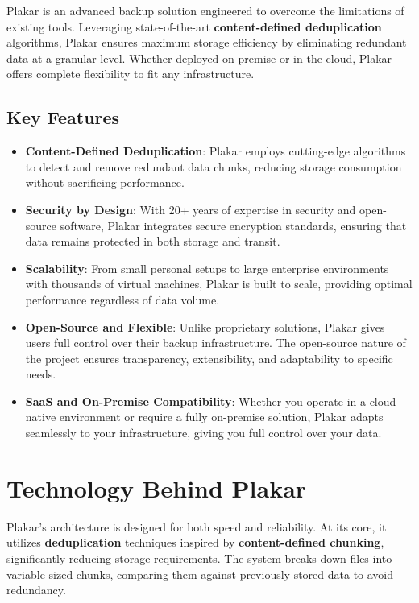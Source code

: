 \documentclass{article}
\begin{document}
Plakar is an advanced backup solution engineered to overcome the limitations of existing tools. Leveraging state-of-the-art \textbf{content-defined deduplication} algorithms, Plakar ensures maximum storage efficiency by eliminating redundant data at a granular level. Whether deployed on-premise or in the cloud, Plakar offers complete flexibility to fit any infrastructure.

\subsection*{Key Features}

\begin{itemize}
    \item \textbf{Content-Defined Deduplication}: Plakar employs cutting-edge algorithms to detect and remove redundant data chunks, reducing storage consumption without sacrificing performance.
    \item \textbf{Security by Design}: With 20+ years of expertise in security and open-source software, Plakar integrates secure encryption standards, ensuring that data remains protected in both storage and transit.
    \item \textbf{Scalability}: From small personal setups to large enterprise environments with thousands of virtual machines, Plakar is built to scale, providing optimal performance regardless of data volume.
    \item \textbf{Open-Source and Flexible}: Unlike proprietary solutions, Plakar gives users full control over their backup infrastructure. The open-source nature of the project ensures transparency, extensibility, and adaptability to specific needs.
    \item \textbf{SaaS and On-Premise Compatibility}: Whether you operate in a cloud-native environment or require a fully on-premise solution, Plakar adapts seamlessly to your infrastructure, giving you full control over your data.
\end{itemize}

\section*{Technology Behind Plakar}

Plakar's architecture is designed for both speed and reliability. At its core, it utilizes \textbf{deduplication} techniques inspired by \textbf{content-defined chunking}, significantly reducing storage requirements. The system breaks down files into variable-sized chunks, comparing them against previously stored data to avoid redundancy.
\end{document}
